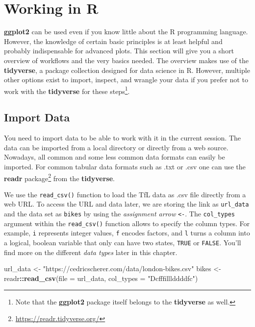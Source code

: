 \documentclass[
]{krantz}
\makeatletter
\newenvironment{Shaded}{\begin{snugshade}}{\end{snugshade}}
\newcommand{\AttributeTok}[1]{\textcolor[rgb]{0.27,0.27,0.27}{#1}}
\newcommand{\FunctionTok}[1]{\textcolor[rgb]{0.27,0.27,0.27}{\textbf{#1}}}
\newcommand{\NormalTok}[1]{#1}
\newcommand{\OtherTok}[1]{\textcolor[rgb]{0.37,0.37,0.37}{#1}}
\newcommand{\SpecialCharTok}[1]{\textcolor[rgb]{0.43,0.43,0.43}{\textbf{#1}}}
\newcommand{\StringTok}[1]{\textcolor[rgb]{0.5,0.5,0.5}{#1}}
\renewcommand{\href}[2]{#2\footnote{\url{#1}}}
\newenvironment{kframe}{%
\medskip{}
\setlength{\fboxsep}{.8em}
 \def\at@end@of@kframe{}%
 \ifinner\ifhmode%
  \def\at@end@of@kframe{\end{minipage}}%
  \begin{minipage}{\columnwidth}%
 \fi\fi%
 \def\FrameCommand##1{\hskip\@totalleftmargin \hskip-\fboxsep
 \colorbox{shadecolor}{##1}\hskip-\fboxsep
     \hskip-\linewidth \hskip-\@totalleftmargin \hskip\columnwidth}%
 \MakeFramed {\advance\hsize-\width
   \@totalleftmargin\z@ \linewidth\hsize
   \@setminipage}}%
 {\par\unskip\endMakeFramed%
 \at@end@of@kframe}
\renewenvironment{Shaded}{\begin{kframe}}{\end{kframe}}
\makeatother
\begin{document}
\hypertarget{rstats}{%
\section{Working in R}\label{rstats}}

\textbf{ggplot2} can be used even if you know little about the R programming language. However, the knowledge of certain basic principles is at least helpful and probably indispensable for advanced plots. This section will give you a short overview of workflows and the very basics needed. The overview makes use of the \textbf{tidyverse}, a package collection designed for data science in R. However, multiple other options exist to import, inspect, and wrangle your data if you prefer not to work with the \textbf{tidyverse} for these steps\footnote{Note that the \textbf{ggplot2} package itself belongs to the \textbf{tidyverse} as well.}.

\hypertarget{import}{%
\subsection{Import Data}\label{import}}

You need to import data to be able to work with it in the current session. The data can be imported from a local directory or directly from a web source. Nowadays, all common and some less common data formats can easily be imported. For common tabular data formats such as .txt or .csv one can use the \href{https://readr.tidyverse.org/}{\textbf{readr} package} \citep{readr} from the \textbf{tidyverse}.

We use the \texttt{read\_csv()} function to load the TfL data as .csv file directly from a web URL. To access the URL and data later, we are storing the link as \texttt{url\_data} and the data set as \texttt{bikes} by using the \emph{assignment arrow} \texttt{\textless{}-}. The \texttt{col\_types} argument within the \texttt{read\_csv()} function allows to specify the column types. For example, \texttt{i} represents integer values, \texttt{f} encodes factors, and \texttt{l} turns a column into a logical, boolean variable that only can have two states, \texttt{TRUE} or \texttt{FALSE}. You'll find more on the different \emph{data types} later in this chapter.

\begin{Shaded}
\begin{Highlighting}[]
\NormalTok{url\_data }\OtherTok{\textless{}{-}} \StringTok{"https://cedricscherer.com/data/london{-}bikes.csv"}
\NormalTok{bikes }\OtherTok{\textless{}{-}}\NormalTok{ readr}\SpecialCharTok{::}\FunctionTok{read\_csv}\NormalTok{(}\AttributeTok{file =}\NormalTok{ url\_data, }\AttributeTok{col\_types =} \StringTok{"Dcfffilllddddfc"}\NormalTok{)}
\end{Highlighting}
\end{Shaded}
\end{document}
